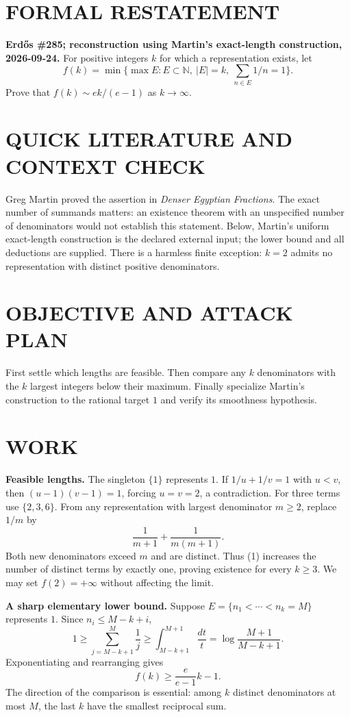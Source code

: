 \section{FORMAL RESTATEMENT}
\textbf{Erd\H{o}s \#285; reconstruction using Martin's exact-length construction, 2026-09-24.}
For positive integers $k$ for which a representation exists, let
\[
f(k)=\min\{\max E: E\subset\mathbb N,\ |E|=k,\ \sum_{n\in E}1/n=1\}.
\]
Prove that $f(k)\sim ek/(e-1)$ as $k\to\infty$.

\section{QUICK LITERATURE AND CONTEXT CHECK}
Greg Martin proved the assertion in \emph{Denser Egyptian Fractions}. The exact number of summands matters: an existence theorem with an unspecified number of denominators would not establish this statement. Below, Martin's uniform exact-length construction is the declared external input; the lower bound and all deductions are supplied. There is a harmless finite exception: $k=2$ admits no representation with distinct positive denominators.

\section{OBJECTIVE AND ATTACK PLAN}
First settle which lengths are feasible. Then compare any $k$ denominators with the $k$ largest integers below their maximum. Finally specialize Martin's construction to the rational target $1$ and verify its smoothness hypothesis.

\section{WORK}
\textbf{Feasible lengths.} The singleton $\{1\}$ represents $1$. If $1/u+1/v=1$ with $u<v$, then $(u-1)(v-1)=1$, forcing $u=v=2$, a contradiction. For three terms use $\{2,3,6\}$. From any representation with largest denominator $m\geq2$, replace $1/m$ by
\[
\frac1{m+1}+\frac1{m(m+1)}.
\tag{1}
\]
Both new denominators exceed $m$ and are distinct. Thus (1) increases the number of distinct terms by exactly one, proving existence for every $k\geq3$. We may set $f(2)=+\infty$ without affecting the limit.

\textbf{A sharp elementary lower bound.} Suppose $E=\{n_1<\cdots<n_k=M\}$ represents $1$. Since $n_i\leq M-k+i$,
\[
1\geq\sum_{j=M-k+1}^{M}\frac1j
\geq\int_{M-k+1}^{M+1}\frac{dt}{t}
=\log\frac{M+1}{M-k+1}.
\]
Exponentiating and rearranging gives
\[
f(k)\geq\frac{e}{e-1}k-1.
\tag{2}
\]
The direction of the comparison is essential: among $k$ distinct denominators at most $M$, the last $k$ have the smallest reciprocal sum.

